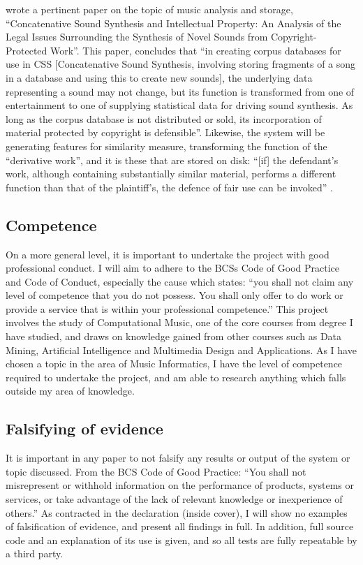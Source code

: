 \citet{Sturm2006} wrote a pertinent paper on the topic of music analysis and storage, ``Concatenative Sound Synthesis and Intellectual Property: An Analysis of the Legal Issues Surrounding the Synthesis of Novel Sounds from
Copyright-Protected Work''. This paper, concludes that
``in creating corpus databases for use in CSS [Concatenative Sound
Synthesis, involving storing fragments of a song in a database and
using this to create new sounds], the underlying data representing a
sound may not change, but its function is transformed from one of
entertainment to one of supplying statistical data for driving sound
synthesis. As long as the corpus database is not distributed or sold,
its incorporation of material protected by copyright is defensible''.
Likewise, the system will be generating features for similarity measure, transforming the function of the ``derivative work'', and it is these that are stored on disk: ``[if] the defendant's work, although containing
substantially similar material, performs a different function than that of the plaintiff's, the defence of fair use can be invoked'' \citep{Copyright1988}.
\subsection{Competence}
On a more general level, it is important to undertake the project with good professional conduct. I will aim to adhere to the BCSs Code of Good Practice and Code of Conduct, especially the cause which states: ``you shall not claim any level of competence that you do not possess. You shall only offer to do work or provide a service that is within your professional competence.''
This project involves the study of Computational Music, one of the core courses
from degree I have studied, and draws on knowledge gained from other courses such as
Data Mining, Artificial Intelligence and Multimedia Design and Applications.
As I have chosen a topic in the area of Music Informatics, I have the level of
competence required to undertake the project, and am able to research anything
which falls outside my area of knowledge.
\subsection{Falsifying of evidence}
It is important in any paper to not falsify any results or output of the system or topic discussed. From the BCS Code of Good Practice: ``You shall not misrepresent or withhold information on the performance of products, systems or services, or take advantage of the lack of relevant knowledge or inexperience of others.'' As contracted in the declaration (inside cover), I will show no examples of falsification of evidence, and present all findings in full. In addition, full source code and an explanation of its use is given, and so all tests are fully repeatable by a third party.
